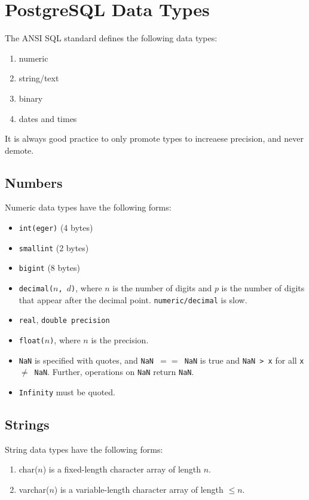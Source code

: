 \documentclass{report}
\newenvironment{aside}[1]{\begin{tcolorbox}[title={Aside: #1},colback=blue!5!white,colframe=black!75!blue]}{\end{tcolorbox}}
\renewcommand{\tt}[1]{\texttt{{#1}}}
\begin{document}
\chapter{PostgreSQL Data Types}
The ANSI SQL standard defines the following data types:
\begin{enumerate}[label=\textit{(\roman*)}]
    \item numeric
    \item string/text
    \item binary
    \item dates and times
\end{enumerate}

\begin{aside}{Promoted}
    It is always good practice to only promote types to increaese precision, and never demote.
\end{aside}


\section{Numbers}
Numeric data types have the following forms:
\begin{itemize}[label=$\to$]
    \item \tt{int(eger)} (4 bytes)
    \item \tt{smallint} (2 bytes)
    \item \tt{bigint} (8 bytes)
    \item \tt{decimal($n$, $d$)}, where $n$ is the number of digits and $p$ is the number of digits
        that appear after the decimal point. \tt{numeric/decimal} is slow.
    \item \tt{real}, \tt{double precision}
    \item \tt{float($n$)}, where $n$ is the precision.
    \item \tt{NaN} is specified with quotes, and \tt{NaN $==$ NaN} is true and \tt{NaN > x} for all
        \tt{x $\neq$ NaN}. Further, operations on \tt{NaN} return \tt{NaN}.
    \item \tt{Infinity} must be quoted.
\end{itemize}


\section{Strings}
String data types have the following forms:
\begin{enumerate}[label=$\to$]
    \item char($n$) is a fixed-length character array of length $n$.
    \item varchar($n$) is a variable-length character array of length $\leq n$.
\end{enumerate}
\end{document}
